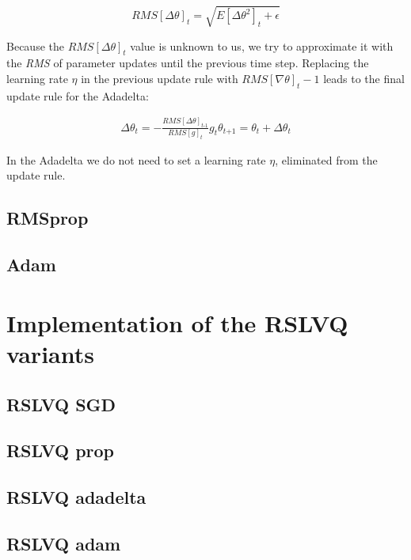 \documentclass[12pt,oneside,a4paper,parskip]{scrbook}
\begin{document}
\begin{equation}
  \textit{RMS}[\Delta\theta]_t = \sqrt{\textit{E}[\Delta\theta^2]_t + \epsilon}
\end{equation}

Because the $\textit{RMS}[\Delta\theta]_t$ value is unknown to us, we try to approximate it with the \textit{RMS} of 
parameter updates until the previous time step. Replacing the learning rate $\eta$ in the previous update rule with $\textit{RMS}[\nabla\theta]_t-1$
leads to the final update rule for the Adadelta:

\begin{equation}
  \begin{split}
  \Delta\theta_t = - \frac{\textit{RMS}[\Delta\theta]_\textit{t-1}}{RMS[\textit{g}]_t} \textit{g}_\textit{t}
  \theta_\textit{t+1} = \theta_t + \Delta\theta_t
  \end{split}
\end{equation}

In the Adadelta we do not need to set a learning rate $\eta$, eliminated from the update rule. \cite{overvieDiffRSLVQ}

\subsection{RMSprop}

\subsection{Adam}

\section{Implementation of the RSLVQ variants}

\subsection{RSLVQ SGD}

\subsection{RSLVQ prop}

\subsection{RSLVQ adadelta}

\subsection{RSLVQ adam}
\end{document}
